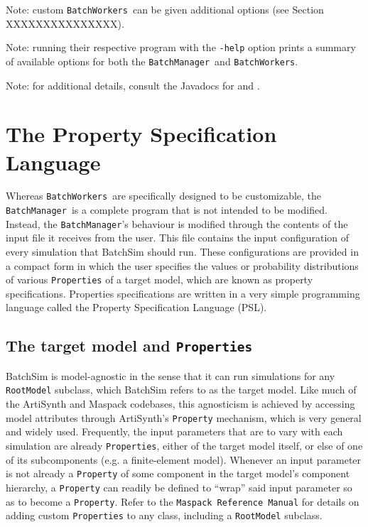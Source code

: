 \documentclass{article}
\newcommand{\BM}{{\tt BatchManager}}
\newcommand{\BWs}{{\tt BatchWorkers}}
\begin{document}
\begin{sideblock}
Note: custom \BWs\ can be given additional options (see Section XXXXXXXXXXXXXXX).
\end{sideblock}

\begin{sideblock}
Note: running their respective program with the {\tt -help} option prints a summary of available options for both the \BM\ and \BWs.
\end{sideblock}

\begin{sideblock}
Note: for additional details, consult the Javadocs for  and .
\end{sideblock}

\section{The Property Specification Language}

Whereas \BWs\ are specifically designed to be customizable, the \BM\ is a complete program that is not intended to be modified. Instead, the \BM's behaviour is modified through the contents of the input file it receives from the user. This file contains the input configuration of every simulation that BatchSim should run. These configurations are provided in a compact form in which the user specifies the values or probability distributions of various {\tt Properties} of a target model, which are known as property specifications. Properties specifications are written in a very simple programming language called the Property Specification Language (PSL).

\subsection{The target model and {\tt Properties}}

BatchSim is model-agnostic in the sense that it can run simulations for any {\tt RootModel} subclass, which BatchSim refers to as the target model. Like much of the ArtiSynth and Maspack codebases, this agnosticism is achieved by accessing model attributes through ArtiSynth's {\tt Property} mechanism, which is very general and widely used. Frequently, the input parameters that are to vary with each simulation are already {\tt Properties}, either of the target model itself, or else of one of its subcomponents (e.g. a finite-element model). Whenever an input parameter is not already a {\tt Property} of some component in the target model's component hierarchy, a {\tt Property} can readily be defined to ``wrap'' said input parameter so as to become a {\tt Property}. Refer to the {\tt Maspack Reference Manual} for details on adding custom {\tt Properties} to any class, including a {\tt RootModel} subclass.
\end{document}
